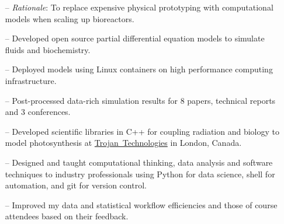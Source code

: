 \documentclass[10pt,a4paper]{altacv}
\begin{document}


\begin{fullwidth}
\makecvheader

\end{fullwidth}




\begin{itemize}
    \setlength{\itemindent}{0.3em}
    \item[--]  \small{\textit{Rationale}: To replace expensive physical 
    prototyping with computational models when scaling up bioreactors.}
    \item[--]   \small{Developed open source partial differential equation
    models to simulate fluids and biochemistry.} 
    \item[--] \small{Deployed models using Linux containers 
    on high performance computing infrastructure.}
    \item[--]  \small{Post-processed data-rich simulation results for 8 papers, 
    technical reports and 3 conferences.}
    \item[--]   \small{Developed scientific libraries in C++ for coupling 
    radiation and biology to model photosynthesis at 
    \href{https://www.trojantechnologies.com/}{Trojan~Technologies} 
    in London, Canada.}
\end{itemize}
\divider\smallskip

\begin{itemize}
    \setlength{\itemindent}{0.3em}
    \item[--]   \small{Designed and taught computational thinking, 
    data analysis and software techniques to industry professionals using
    Python for data science, shell for automation, and git for version
    control.}
    \item[--]   \small{Improved my data and statistical workflow 
    efficiencies and those of course attendees based on their feedback.}
\end{itemize}
\divider\smallskip
\end{document}
